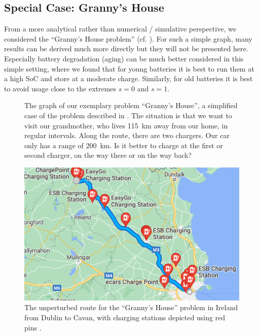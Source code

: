 \documentclass{prettytex/ox/mmsc-special-topic}
\begin{document}
  \subsection{Special Case: Granny's House}
  From a more analytical rather than numerical / simulative perspective, we considered the ``Granny's House problem'' (cf. ).
  For such a simple graph, many results can be derived much more directly but they will not be presented here.
  Especially battery degradation (aging) can be much better considered in this simple setting, where we found that for young batteries it is best to run them at a high SoC and store at a moderate charge. Similarly, for old batteries it is best to avoid usage close to the extremes $s = 0$ and $s = 1$.

  \begin{figure}[H]
    \centering
    \caption{The graph of our exemplary problem ``Granny's House'', a simplified case of the problem described in . The situation is that we want to visit our grandmother, who lives \SI{115}{\kilo\meter} away from our home, in regular intervals. Along the route, there are two chargers. Our car only has a range of \SI{200}{\kilo\meter}. Is it better to charge at the first or second charger, on the way there or on the way back?}
    \label{fig:grannys-idealised-problem-setting}
  \end{figure}

  \begin{figure}[H]
    \centering
    \includegraphics[width=0.4\linewidth]{figures/grannys-stations.png}
    \caption{The unperturbed route for the ``Granny's House'' problem in Ireland from Dublin to Cavan, with charging stations depicted using red pins \parencite{googlemaps}.}
    \label{fig:grannys-stations}
  \end{figure}
\end{document}

